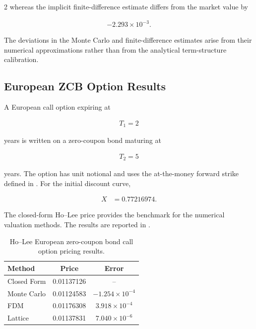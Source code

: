 \documentclass[10pt,a4paper]{article}
\numberwithin{equation}{section}
\begin{document}
\begin{multicols}{2}
whereas the implicit finite-difference estimate differs from the market
value by

\begin{align*}
    -2.293\times10^{-3}.
\end{align*}

The deviations in the Monte Carlo and finite-difference estimates arise
from their numerical approximations rather than from the analytical
term-structure calibration.

\subsection{European ZCB Option Results}

A European call option expiring at

\begin{align*}
    T_1 = 2
\end{align*}

years is written on a zero-coupon bond maturing at

\begin{align*}
    T_2 = 5
\end{align*}

years. The option has unit notional and uses the at-the-money forward
strike defined in . For the initial discount
curve,

\begin{align*}
    X
    &=
    0.77216974.
\end{align*}

The closed-form Ho--Lee price provides the benchmark for the numerical
valuation methods. The results are reported in
.

\begin{table}[H]
    \centering

    \caption{
        Ho--Lee European zero-coupon bond call option pricing results.
    }
    \label{tab:zcb_option_results}

    \small
    \renewcommand{\arraystretch}{1.15}

    \begin{tabular}{lcc}
        \toprule
        \textbf{Method}
        &
        \textbf{Price}
        &
        \textbf{Error}
        \\
        \midrule
        Closed Form
        & 0.01137126
        & -- \\
        Monte Carlo
        & 0.01124583
        & $-1.254\times10^{-4}$ \\
        FDM
        & 0.01176308
        & $3.918\times10^{-4}$ \\
        Lattice
        & 0.01137831
        & $7.040\times10^{-6}$ \\
        \bottomrule
    \end{tabular}
\end{table}


\end{multicols}
\end{document}
